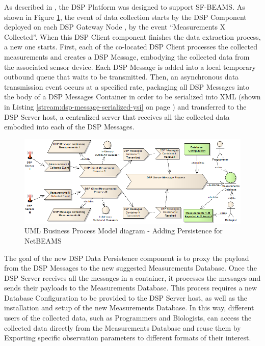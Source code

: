 As described in \cite{netbeams-dsp-architecture}, the DSP Platform was designed
to support SF-BEAMS. As shown in Figure \ref{fig:dsp-persistence-business-process}, 
the event of data collection starts by the DSP Component deployed on each 
DSP Gateway Node \cite{netbeams-dsp-architecture}, by the event ``Measurements
X Collected''. When this DSP Client component finishes the data extraction
process, a new one starts. First, each of the co-located DSP Client processes 
the collected measurements and creates a DSP Message, embodying the collected 
data from the associated sensor device. Each DSP Message is added into a local
temporary outbound queue that waits to be transmitted. Then, an asynchronous 
data transmission event occurs at a specified rate, packaging all DSP
Messages into the body of a DSP Messages Container in order to be serialized
into XML (shown in Listing \ref{stream:dsp-message-serialized-ysi} on page
\pageref{stream:dsp-message-serialized-ysi}) and transferred to the DSP Server
host, a centralized server that receives all the collected data embodied into each of the DSP Messages.

\begin{figure}[!b]
  \centering
  \includegraphics[scale=0.6]{../diagrams/DSP-DataPersistence-Business-Diagram}
  \caption{UML Business Process Model diagram - Adding Persistence for NetBEAMS}
  \label{fig:dsp-persistence-business-process}
\end{figure}

The goal of the new DSP Data Persistence component is to proxy the payload 
from the DSP Messages to the new suggested Measurements Database. Once the DSP
Server receives all the messages in a container, it processes the messages and
sends their payloads to the Measurements Database. This process requires a new
Database Configuration to be provided to the DSP Server host, as well as the
installation and setup of the new Measurements Database. In this way, different
users of the collected data, such as Programmers and Biologists, can access the
collected data directly from the Measurements Database and reuse them by
Exporting specific observation parameters to different formats of their
interest.

